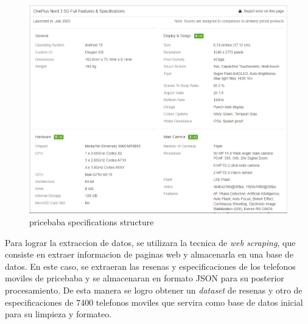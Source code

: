 \begin{figure}[H]
    \centering
    \includegraphics[width=12cm]{images/pricebaba_spec_structure.png}
    \caption{pricebaba specifications structure}
    \label{fig:pricebaba-spec-structure}
\end{figure}
Para lograr la extraccion de datos, se utilizara la tecnica de \textit{web scraping}, que consiste en extraer informacion de paginas web y almacenarla en una base de datos. En este caso, se extraeran las resenas y especificaciones de los telefonos moviles de pricebaba y se almacenaran en formato JSON para su posterior procesamiento. De esta manera se logro obtener un \textit{dataset} de resenas y otro de especificaciones de 7400 telefonos moviles que servira como base de datos inicial para su limpieza y formateo.

